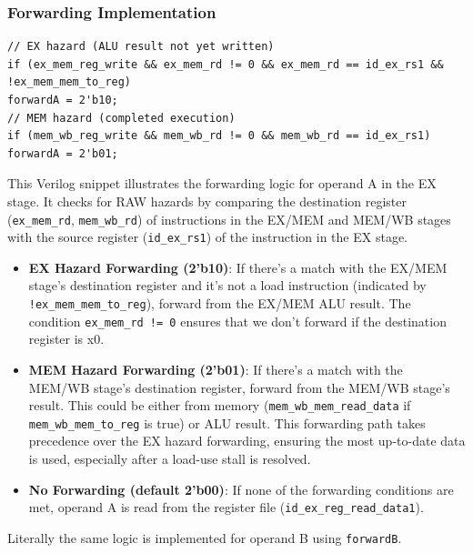 \documentclass{article}
\numberwithin{figure}{section}
\numberwithin{table}{section}
\begin{document}
\subsubsection{Forwarding  Implementation}
\begin{lstlisting}[style=verilog-style]
// EX hazard (ALU result not yet written)
if (ex_mem_reg_write && ex_mem_rd != 0 && ex_mem_rd == id_ex_rs1 && !ex_mem_mem_to_reg)
forwardA = 2'b10;
// MEM hazard (completed execution)
if (mem_wb_reg_write && mem_wb_rd != 0 && mem_wb_rd == id_ex_rs1)
forwardA = 2'b01;\end{lstlisting}
    This Verilog snippet illustrates the forwarding logic for operand A in the EX stage. It checks for RAW hazards by comparing the destination register (\texttt{ex\_mem\_rd}, \texttt{mem\_wb\_rd}) of instructions in the EX/MEM and MEM/WB stages with the source register (\texttt{id\_ex\_rs1}) of the instruction in the EX stage.
    \begin{itemize}
        \item \textbf{EX Hazard Forwarding (2'b10)}: If there's a match with the EX/MEM stage's destination register and it's not a load instruction (indicated by \texttt{!ex\_mem\_mem\_to\_reg}), forward from the EX/MEM ALU result. The condition \texttt{ex\_mem\_rd != 0} ensures that we don't forward if the destination register is x0.
        \item \textbf{MEM Hazard Forwarding (2'b01)}: If there's a match with the MEM/WB stage's destination register, forward from the MEM/WB stage's result. This could be either from memory (\texttt{mem\_wb\_mem\_read\_data} if \texttt{mem\_wb\_mem\_to\_reg} is true) or ALU result. This forwarding path takes precedence over the EX hazard forwarding, ensuring the most up-to-date data is used, especially after a load-use stall is resolved.
        \item \textbf{No Forwarding (default 2'b00)}: If none of the forwarding conditions are met, operand A is read from the register file (\texttt{id\_ex\_reg\_read\_data1}).
    \end{itemize}
    Literally the same logic is implemented for operand B using \texttt{forwardB}.
\end{document}
